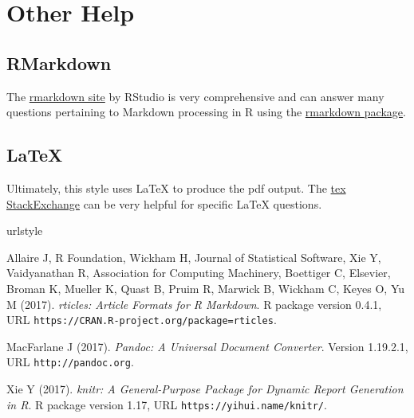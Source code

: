 \documentclass[letterpaper,9pt,twocolumn,twoside,]{pinp}
\begin{document}
\hypertarget{other-help}{%
\section{Other Help}\label{other-help}}

\hypertarget{rmarkdown}{%
\subsection{RMarkdown}\label{rmarkdown}}

The \href{http://rmarkdown.rstudio.com/}{rmarkdown site} by RStudio is
very comprehensive and can answer many questions pertaining to Markdown
processing in R using the
\href{https://cran.r-project.org/package=rmarkdown}{rmarkdown package}.

\hypertarget{latex}{%
\subsection{LaTeX}\label{latex}}

Ultimately, this style uses LaTeX to produce the pdf output. The
\href{http://tex.stackexchange.com}{tex StackExchange} can be very
helpful for specific LaTeX questions.

\showacknow




\begin{thebibliography}{3}
\newcommand{\enquote}[1]{``#1''}
\providecommand{\natexlab}[1]{#1}
\providecommand{\url}[1]{\texttt{#1}}
\providecommand{\urlprefix}{URL }
\expandafter\ifx\csname urlstyle\endcsname\relax
  \providecommand{\doi}[1]{doi:\discretionary{}{}{}#1}\else
  \providecommand{\doi}{doi:\discretionary{}{}{}\begingroup
  \urlstyle{rm}\Url}\fi
\providecommand{\eprint}[2][]{\url{#2}}

Allaire J, {R Foundation}, Wickham H, {Journal of Statistical Software}, Xie Y,
  Vaidyanathan R, {Association for Computing Machinery}, Boettiger C,
  {Elsevier}, Broman K, Mueller K, Quast B, Pruim R, Marwick B, Wickham C,
  Keyes O, Yu M (2017).
\newblock \emph{rticles: Article Formats for R Markdown}.
\newblock R package version 0.4.1,
  \urlprefix\url{https://CRAN.R-project.org/package=rticles}.

MacFarlane J (2017).
\newblock \emph{Pandoc: A Universal Document Converter}.
\newblock Version 1.19.2.1, \urlprefix\url{http://pandoc.org}.

Xie Y (2017).
\newblock \emph{knitr: A General-Purpose Package for Dynamic Report Generation
  in R}.
\newblock R package version 1.17, \urlprefix\url{https://yihui.name/knitr/}.

\end{thebibliography}
\end{document}
